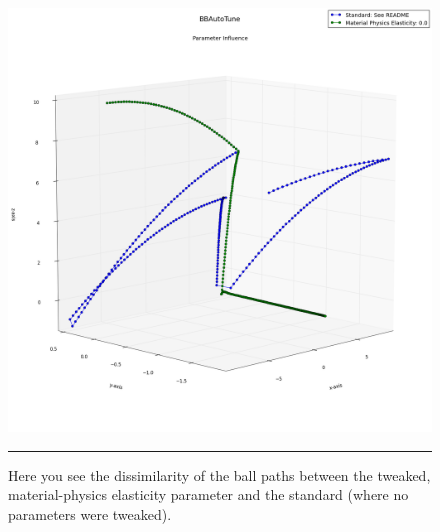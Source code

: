 \begin{figure}[htbp]
\centering
\includegraphics[scale=0.35]{../Figures/Chapter4/material_physics_ball_plot.png}
\rule{35em}{0.5pt}
\caption[Physics Engine Racquetball Path Dissimilarity]{Here you see the dissimilarity of the ball paths between the tweaked, material-physics elasticity parameter and the standard (where no parameters were tweaked).}
\label{fig:matphysplot}
\end{figure}

